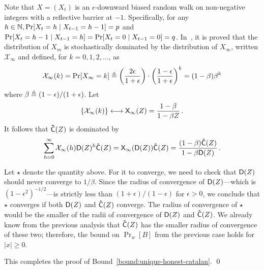   Note that $X = (X_t)$ is an $\epsilon$-downward biased random walk 
  on non-negative integers with a reflective barrier at $-1$. 
  Specifically, 
  for any $h \in \mathbb{N}, \Pr[X_t = h \mid X_{t-1} = h -1] = p$ and 
  $\Pr[X_t = h - 1 \mid X_{t-1} = h] = \Pr[X_t = 0 \mid X_{t-1} = 0] = q$. 
  In~\cite[Lemma 6.1]{LinearConsistencySODA}, it is proved that 
  the distribution of $X_m$ is stochastically dominated by 
  the distribution of $X_\infty$, written $\mathcal{X}_\infty$ and 
  defined, for $k = 0, 1, 2, \ldots$, as 
  \begin{equation}
    \label{eq:stationary}
      \mathcal{X}_\infty(k) = \Pr[X_\infty = k] 
      \triangleq 
        \left(\frac{2\epsilon}{1+\epsilon}\right)\cdot \left(\frac{1-\epsilon}{1 + \epsilon}\right)^k
        = 
      (1 - \beta) \beta^k
  \end{equation}
  where $\beta \triangleq (1-\epsilon)/(1+\epsilon)$. 
  Let 
  $$
    \{\mathcal{X}_\infty(k)\} \longleftrightarrow \mathsf{X}_\infty(Z) = 
    \frac{1 - \beta}{1 - \beta Z}
    \,.
  $$ 
  It follows that $\mathsf{\tilde{C}}(Z)$ is dominated by 
  $$
      \sum_{h = 0}^\infty \mathcal{X}_\infty(h) \mathsf{D}(Z)^h \mathsf{\hat{C}}(Z)
    = \mathsf{X}_\infty(\mathsf{D}(Z)) \mathsf{\hat{C}}(Z)
    = \frac{(1 - \beta)\mathsf{\hat{C}}(Z)}{1 - \beta \mathsf{D}(Z)}
    \,.
  $$

  Let $\star$ denote the quantity above. 
  For it to converge, 
  we need to check that $\mathsf{D}(Z)$
  should never converge to $1/\beta$.  
  Since the radius of convergence of $\mathsf{D}(Z)$---which is
  $(1-\epsilon^2)^{-1/2}$---is strictly less than 
  $(1+\epsilon)/(1-\epsilon)$ for $\epsilon > 0$, 
  we conclude that $\star$ converges if
  both $\mathsf{D}(Z)$ and $\mathsf{\hat{C}}(Z)$ converge.  The radius of
  convergence of $\star$ would be the smaller of the radii
  of convergence of $\mathsf{D}(Z)$ and $\mathsf{\hat{C}}(Z)$.  We already
  know from the previous analysis that $\mathsf{\hat{C}}(Z)$ has the
  smaller radius of convergence of these two; 
  therefore, the bound
  on $\Pr_w[B]$ from the previous case holds for $|x| \geq 0$. 

  This completes the proof of Bound~\ref{bound:unique-honest-catalan}.
  \hfill\qed




  



